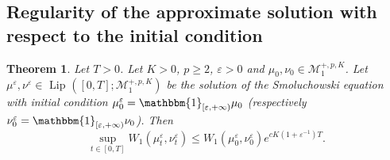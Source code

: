 \documentclass[a4paper,11pt, reqno]{amsart}
\newcommand{\cM}{\mathcal{M}}	\newcommand{\MM}{\mathbbm{M}}
\newcommand{\eps}{\varepsilon}
\newcommand{\red}[1]{{\color{red} #1}}
\newcommand{\1}{\mathbbm{1}}
\theoremstyle{plain}
\newtheorem{theorem}{Theorem}[section]
\theoremstyle{definition}
\begin{document}
\subsection{Regularity of the approximate solution with respect to the initial
condition}

\begin{theorem}
  \label{theorem:flow-lipschitz}Let $T > 0$. Let $K > 0$, \red{$p
  \ge 2$}, $\eps > 0$ and $\mu_0, \nu_0 \in \cM_1^{+, p,
  K}$. Let $\mu^{\eps}, \nu^{\eps} \in  \text{ Lip } ([0, T] ;
  \cM_1^{+, p, K})$ be the solution of the Smoluchowski equation with
  initial condition $\mu^{\eps}_0 = \mathbbm{1}_{[\eps, +
  \infty)} \mu_0$ (respectively $\nu^{\eps}_0 =
  \mathbbm{1}_{[\eps, + \infty)} \nu_0$). Then
  \[ \underset{t \in [0, T]}{\sup} W_1 (\mu^{\eps}_t,
     \nu^{\eps}_t) \le W_1 (\mu^{\eps}_0,
     \nu^{\eps}_0) e^{c K (1 + \eps^{- 1}) T} . \]
\end{theorem}
\end{document}
